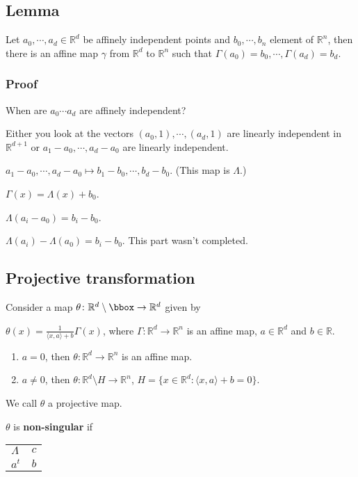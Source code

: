 \documentclass[11pt]{article}
\def\R{\mathbb{R}}
\begin{document}
{{{{\subsection{Lemma}
\label{sec:org8d2e434}
Let \(a_0, \cdots, a_d \in \R^d\) be affinely independent points and \(b_0,
   \cdots, b_n\) element of \(\R^n\), then there is an affine map \(\gamma\) from
\(\R^d\) to \(\R^n\) such that \(\Gamma(a_0) = b_0, \cdots, \Gamma(a_d) = b_d\).
\subsubsection{Proof}
\label{sec:orga2770e0}
When are \(a_0 \cdots a_d\) are affinely independent?

Either you look at the vectors \((a_0, 1), \cdots, (a_d,1)\) are linearly
independent in \(\R^{d+1}\) or \(a_1 - a_0, \cdots, a_d - a_0\) are linearly
independent.

\(a_1 - a_0, \cdots, a_d - a_0 \mapsto b_1 - b_0, \cdots, b_d - b_0\). (This
map is \(\Lambda\).)

\(\Gamma(x) = \Lambda(x) + b_0\).

\(\Lambda(a_i - a_0) = b_i - b_0\).

\(\Lambda(a_i) - \Lambda(a_0) = b_i - b_0\). This part wasn't completed.
\subsection{Projective transformation}
\label{sec:org2eaebf9}
Consider a map \(\theta \colon \R^d \setminus \bbox \rightarrow \R^d\) given by

\(\theta(x) = \frac{1}{\langle x, a \rangle + b} \Gamma(x)\), where \(\Gamma
   \colon \R^d \rightarrow \R^n\) is an affine map, \(a\in \R^d\) and \(b\in \R\).

\begin{enumerate}
\item \(a = 0\), then \(\theta \colon \R^d \rightarrow \R^n\) is an affine map.
\item \(a \neq 0\), then \(\theta \colon \R^d \setminus H \rightarrow \R^n\), \(H =
      \{x \in \R^d \colon \langle x, a \rangle + b = 0\}\).
\end{enumerate}

We call \(\theta\) a projective map.

\(\theta\) is \textbf{non-singular} if 

\begin{center}
\begin{tabular}{ll}
\(\Lambda\) & \(c\)\\
\(a^t\) & \(b\)\\
\end{tabular}
\end{center}

}}}}
\end{document}
